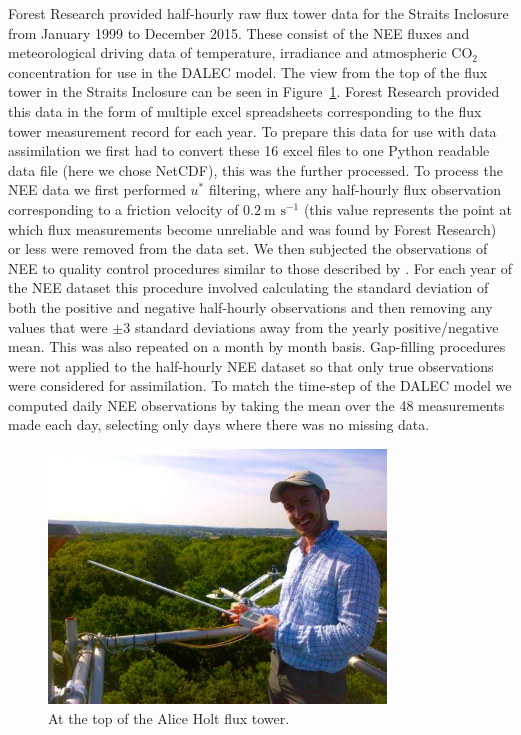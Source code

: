 Forest Research provided half-hourly raw flux tower data for the Straits Inclosure from January 1999 to December 2015. These consist of the NEE fluxes and meteorological driving data of temperature, irradiance and atmospheric CO\(_{2}\) concentration for use in the DALEC model. The view from the top of the flux tower in the Straits Inclosure can be seen in Figure~\ref{chap4:fig:flux_me}. Forest Research provided this data in the form of multiple excel spreadsheets corresponding to the flux tower measurement record for each year. To prepare this data for use with data assimilation we first had to convert these 16 excel files to one Python readable data file (here we chose NetCDF), this was the further processed. To process the NEE data we first performed \(u^*\) filtering, where any half-hourly flux observation corresponding to a friction velocity of \(0.2~\text{m s}^{-1}\) (this value represents the point at which flux measurements become unreliable and was found by Forest Research) or less were removed from the data set. We then subjected the observations of NEE to quality control procedures similar to those described by \citet{papale2006towards}. For each year of the NEE dataset this procedure involved calculating the standard deviation of both the positive and negative half-hourly observations and then removing any values that were \(\pm 3\) standard deviations away from the yearly positive/negative mean. This was also repeated on a month by month basis. Gap-filling procedures were not applied to the half-hourly NEE dataset so that only true observations were considered for assimilation. To match the time-step of the DALEC model we computed daily NEE observations by taking the mean over the 48 measurements made each day, selecting only days where there was no missing data.  
 

\begin{figure}[ht]
    \centering
    \includegraphics[width=0.8\textwidth]{chapter/chapter4/top_of_flux.pdf}
    \caption{At the top of the Alice Holt flux tower.} \label{chap4:fig:flux_me}
\end{figure}

